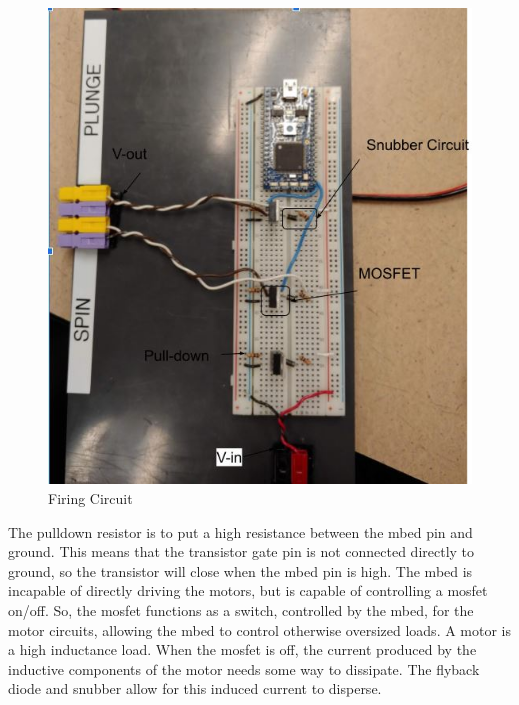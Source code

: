   
\begin{figure}[h!]
    \centering
    \includegraphics[scale=.4]{firecircuit.JPG}
    \caption{Firing Circuit}
    \label{fig:firing circuit}
\end{figure}

The pulldown resistor is to put a high resistance between the mbed pin and ground. This means that the transistor gate pin is not connected directly to ground, so the transistor will close when the mbed pin is high.
The mbed is incapable of directly driving the motors, but is capable of controlling a mosfet on/off. So, the mosfet functions as a switch, controlled by the mbed, for the motor circuits, allowing the mbed to control otherwise oversized loads.
A motor is a high inductance load. When the mosfet is off, the current produced by the inductive components of the motor needs some way to dissipate. The flyback diode and snubber allow for this induced current to disperse. 

